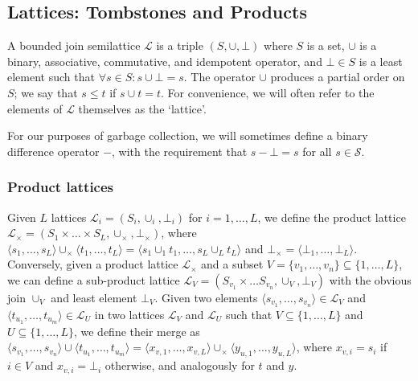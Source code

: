 \documentclass{article}
\numberwithin{equation}{section}
\begin{document}
\subsection{Lattices: Tombstones and Products}
A bounded join semilattice $\mathcal{L}$ is a triple $(S, \cup, \bot)$ where $S$ is a set, $\cup$ is a binary, associative, commutative, and idempotent operator, and $\bot \in S$ is a least element such that $\forall s \in S: s \cup \bot = s$.
The operator $\cup$ produces a partial order on $S$; we say that $s \leq t$ if $s \cup t = t$.
For convenience, we will often refer to the elements of $\mathcal{L}$ themselves as the `lattice'.

For our purposes of garbage collection, we will sometimes define a binary difference operator $-$, with the requirement that $s - \bot = s$ for all $s \in \mathcal{S}$.


\subsubsection{Product lattices}
Given $L$ lattices $\mathcal{L}_i = (S_i, \cup_i, \bot_i)$ for $i = 1, \dots, L$, we define the product lattice $\mathcal{L}_\times = \left(S_1 \times \dots \times S_L, \cup_\times, \bot_\times\right)$, where $\langle s_1, \dots, s_L \rangle \cup_\times \langle t_1, \dots, t_L \rangle = \langle s_1 \cup_1 t_1, \dots, s_L \cup_L t_L \rangle$ and $\bot_\times = \langle \bot_1, \dots, \bot_L \rangle$.
Conversely, given a product lattice $\mathcal{L}_\times$ and a subset $V =\{v_1, \dots, v_n\} \subseteq \{1, \dots, L\}$, we can define a sub-product lattice $\mathcal{L}_V = (S_{v_1} \times \dots S_{v_n}, \cup_V, \bot_V)$ with the obvious join $\cup_V$ and least element $\bot_V$.
Given two elements $\langle s_{v_1}, \dots, s_{v_n}\rangle \in \mathcal{L}_V$ and $\langle t_{u_1}, \dots, t_{u_m}\rangle \in \mathcal{L}_U$ in two lattices $\mathcal{L}_V$ and $\mathcal{L}_U$ such that $V \subseteq \{1,\dots,L\}$ and $U \subseteq \{1,\dots,L\}$, we define their merge as
$\langle s_{v_1}, \dots, s_{v_n}\rangle \cup \langle t_{u_1}, \dots, t_{u_m}\rangle = \langle x_{v,1}, \dots, x_{v,L} \rangle \cup_\times \langle y_{u,1}, \dots, y_{u,L} \rangle$,
where $x_{v,i} = s_i$ if $i \in V$ and $x_{v,i} = \bot_i$ otherwise, and analogously for $t$ and $y$.
\end{document}
